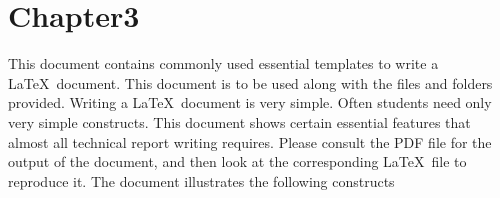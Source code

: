 \chapter{Chapter3}
This document contains commonly used essential templates to write a
\LaTeX\ document. This document is to be used along with the files and
folders provided. Writing a \LaTeX\ document is very simple.  Often
students need only very simple constructs.  This document shows
certain essential features that almost all technical report writing
requires. Please consult the PDF file for the output of the document,
and then look at the corresponding \LaTeX\ file to reproduce it.  The
document illustrates the following constructs

